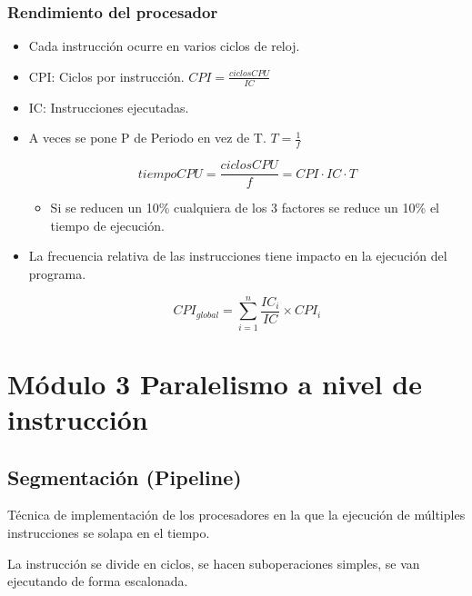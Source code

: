 \documentclass[12pt, twoside, openright]{report} %
\begin{document}
  \subsection{Rendimiento del procesador}

  \begin{itemize}
  
  \item
    Cada instrucción ocurre en varios ciclos de reloj.
  \item
    CPI: Ciclos por instrucción. \(CPI = \frac {ciclosCPU} {IC}\)
  \item
    IC: Instrucciones ejecutadas.
  \item A veces se pone P de Periodo en vez de T. $T=\frac 1f$
  
  $$tiempoCPU = \frac {ciclosCPU} f= CPI\cdot IC\cdot T$$ 
  
  

    \begin{itemize}
    
    \item
      Si se reducen un 10\% cualquiera de los 3 factores se reduce un
      10\% el tiempo de ejecución.
    \end{itemize}
  \item
    La frecuencia relativa de las instrucciones tiene impacto en la
    ejecución del programa.


    

    $$CPI_{global}=\sum_{i=1}^{n} \frac {IC_i} {IC} \times CPI_i$$

    \end{itemize}

  \chapter{Módulo 3 Paralelismo a nivel de instrucción}


  
  \section{Segmentación (Pipeline)}

  Técnica de implementación de los procesadores en la que la ejecución
  de múltiples instrucciones se solapa en el tiempo.

  La instrucción se divide en ciclos, se hacen suboperaciones simples,
  se van ejecutando de forma escalonada.
\end{document}
